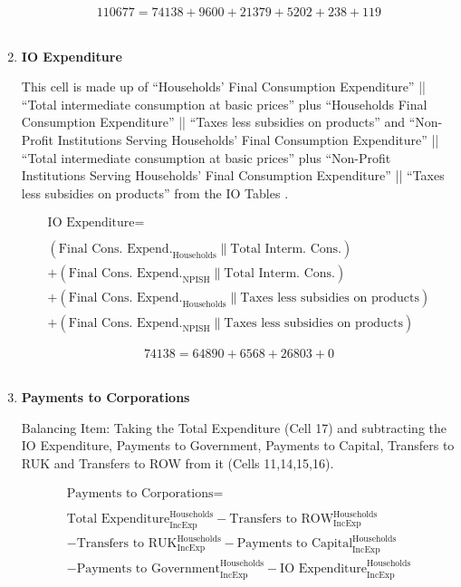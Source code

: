 \begin{enumerate}
\begin{equation} \nonumber
110677 = 74138+9600+21379+5202+238+119
\end{equation}\\


\item \textbf {IO Expenditure}

This cell is made up of ``Households' Final Consumption Expenditure'' || ``Total intermediate consumption at basic prices'' plus ``Households Final Consumption Expenditure'' || ``Taxes less subsidies on products'' and ``Non-Profit Institutions Serving Households' Final Consumption Expenditure'' || ``Total intermediate consumption at basic prices'' plus ``Non-Profit Institutions Serving Households' Final Consumption Expenditure'' || ``Taxes less subsidies on products'' from the IO Tables \cite{ScotGov2013a}.

\begin{equation}
\begin{split}
\text{IO Expenditure} =  \\ \\
(\text{Final Cons. Expend.}_\text{Households}\|\text{Total Interm. Cons.})\\
+(\text{Final Cons. Expend.}_\text{NPISH}\|\text{Total Interm. Cons.})\\
+(\text{Final Cons. Expend.}_\text{Households}\|\text{Taxes less subsidies on products})\\
+(\text{Final Cons. Expend.}_\text{NPISH}\|\text{Taxes less subsidies on products})
\end{split} \label{eq:2.5.15}
\end{equation}

\begin{equation} \nonumber
74138 = 64890+6568+26803+0
\end{equation}\\


\item \textbf {Payments to Corporations}

Balancing Item: Taking the Total Expenditure (Cell 17) and subtracting the IO Expenditure, Payments to Government, Payments to Capital, Transfers to RUK and Transfers to ROW from it (Cells 11,14,15,16).

\begin{equation}
\begin{split}
\text{Payments to Corporations} =  \\ \\
\text{Total Expenditure}^\text{Households}_\text{IncExp}-\text{Transfers to ROW}^\text{Households}_\text{IncExp}\\
-\text{Transfers to RUK}^\text{Households}_\text{IncExp}-\text{Payments to Capital}^\text{Households}_\text{IncExp}\\
-\text{Payments to Government}^\text{Households}_\text{IncExp}-\text{IO Expenditure}^\text{Households}_\text{IncExp}
\end{split} \label{eq:2.5.16}
\end{equation}


\end{enumerate}
